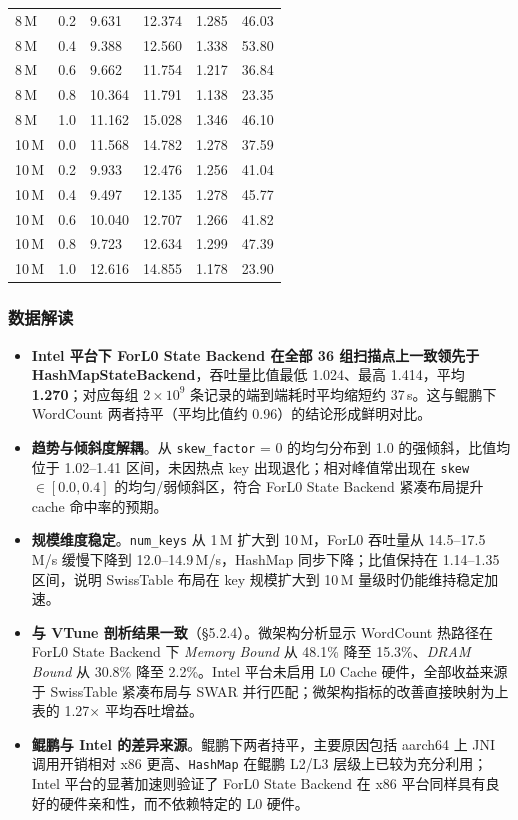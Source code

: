 \documentclass[a4paper,11pt]{article}
\newcommand{\project}{ForL0 State Backend}
\begin{document}
\begin{table}[H]
\begin{tabularx}{\textwidth}{C{1.6cm} C{1.2cm} R{2.2cm} R{2.2cm} R{1.8cm} R{1.8cm}}
8\,M  & 0.2 & 9.631  & 12.374 & 1.285 & 46.03 \\
8\,M  & 0.4 & 9.388  & 12.560 & 1.338 & 53.80 \\
8\,M  & 0.6 & 9.662  & 11.754 & 1.217 & 36.84 \\
8\,M  & 0.8 & 10.364 & 11.791 & 1.138 & 23.35 \\
8\,M  & 1.0 & 11.162 & 15.028 & 1.346 & 46.10 \\
\,M & 0.0 & 11.568 & 14.782 & 1.278 & 37.59 \\
10\,M & 0.2 & 9.933  & 12.476 & 1.256 & 41.04 \\
10\,M & 0.4 & 9.497  & 12.135 & 1.278 & 45.77 \\
10\,M & 0.6 & 10.040 & 12.707 & 1.266 & 41.82 \\
10\,M & 0.8 & 9.723  & 12.634 & 1.299 & 47.39 \\
10\,M & 1.0 & 12.616 & 14.855 & 1.178 & 23.90 \\
\bottomrule
\end{tabularx}
\end{table}

\subsubsection{数据解读}

\begin{itemize}
  \item \textbf{Intel 平台下 \project{} 在全部 36 组扫描点上一致领先于 HashMapStateBackend}，吞吐量比值最低 1.024、最高 1.414，平均 \textbf{1.270}；对应每组 2\,$\times\,10^9$ 条记录的端到端耗时平均缩短约 37\,s。这与鲲鹏下 WordCount 两者持平（平均比值约 0.96）的结论形成鲜明对比。
  \item \textbf{趋势与倾斜度解耦}。从 \texttt{skew\_factor} = 0 的均匀分布到 1.0 的强倾斜，比值均位于 1.02--1.41 区间，未因热点 key 出现退化；相对峰值常出现在 \texttt{skew} $\in [0.0, 0.4]$ 的均匀/弱倾斜区，符合 \project{} 紧凑布局提升 cache 命中率的预期。
  \item \textbf{规模维度稳定}。\texttt{num\_keys} 从 1\,M 扩大到 10\,M，ForL0 吞吐量从 14.5--17.5\,M/s 缓慢下降到 12.0--14.9\,M/s，HashMap 同步下降；比值保持在 1.14--1.35 区间，说明 SwissTable 布局在 key 规模扩大到 10\,M 量级时仍能维持稳定加速。
  \item \textbf{与 VTune 剖析结果一致}（\S5.2.4）。微架构分析显示 WordCount 热路径在 \project{} 下 \emph{Memory Bound} 从 48.1\% 降至 15.3\%、\emph{DRAM Bound} 从 30.8\% 降至 2.2\%。Intel 平台未启用 L0 Cache 硬件，全部收益来源于 SwissTable 紧凑布局与 SWAR 并行匹配；微架构指标的改善直接映射为上表的 1.27$\times$ 平均吞吐增益。
  \item \textbf{鲲鹏与 Intel 的差异来源}。鲲鹏下两者持平，主要原因包括 aarch64 上 JNI 调用开销相对 x86 更高、\texttt{HashMap} 在鲲鹏 L2/L3 层级上已较为充分利用；Intel 平台的显著加速则验证了 \project{} 在 x86 平台同样具有良好的硬件亲和性，而不依赖特定的 L0 硬件。
\end{itemize}
\end{document}
